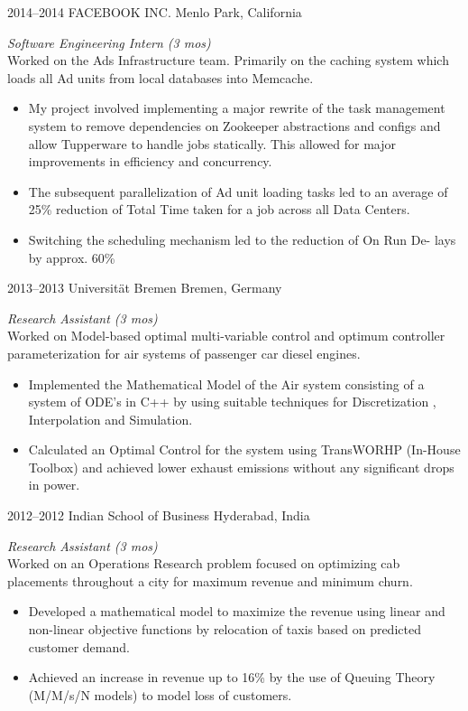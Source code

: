 \documentclass[print]{friggeri-cv} %
\begin{document}
\begin{entrylist}
\entry
{2014--2014}
{FACEBOOK INC.}
{Menlo Park, California}
{\emph{Software Engineering Intern (3 mos)} \\
Worked on the Ads Infrastructure team. Primarily on the caching system which loads all Ad units from local databases into Memcache.

\begin{itemize}
\item My project involved implementing a major rewrite of the task management system to remove dependencies on Zookeeper abstractions and configs and allow Tupperware to handle jobs statically. This allowed for major improvements in efficiency and concurrency.
\item The subsequent parallelization of Ad unit loading tasks led to an average of 25\% reduction of Total Time taken for a job across all Data Centers.
\item Switching the scheduling mechanism led to the reduction of On Run De-
lays by approx. 60\%
\end{itemize}}

\end{entrylist}
\begin{entrylist}
\entry
{2013--2013}
{Universität Bremen}
{Bremen, Germany}
{\emph{Research Assistant (3 mos)} \\
Worked on Model-based optimal multi-variable control and optimum controller parameterization for air systems of passenger car diesel engines.

\begin{itemize}
\item Implemented the Mathematical Model of the Air system consisting of a system of ODE’s in C++ by using suitable techniques for Discretization , Interpolation and Simulation.
\item Calculated an Optimal Control for the system using TransWORHP (In-House Toolbox) and achieved lower exhaust emissions without any significant drops in power.
\end{itemize}}

\entry
{2012--2012}
{Indian School of Business}
{Hyderabad, India}
{\emph{Research Assistant (3 mos)} \\
Worked on an Operations Research problem focused on optimizing cab placements throughout a city for maximum revenue and minimum churn.

\begin{itemize}
\item Developed a mathematical model to maximize the revenue using linear and non-linear objective functions by relocation of taxis based on predicted customer demand.
\item Achieved an increase in revenue up to 16\% by the use of Queuing Theory (M/M/s/N models) to model loss of customers.
\end{itemize}}

\end{entrylist}
\end{document}

